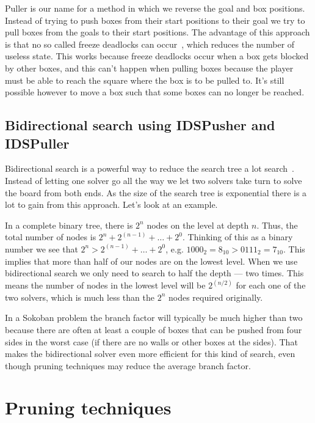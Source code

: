 \documentclass[a4paper,11pt]{article}
\renewcommand{\*}[0]{\cdot}
\begin{document}
Puller is our name for a method in which we reverse the goal and box positions.
Instead of trying to push boxes from their start positions to their goal we try
to pull boxes from the goals to their start positions. The advantage of this
approach is that no so called freeze deadlocks can occur~\cite{takes2007},
which reduces the number of useless state. This works because freeze deadlocks
occur when a box gets blocked by other boxes, and this can't happen when
pulling boxes because the player must be able to reach the square where the box
is to be pulled to.  It's still possible however to move a box such that some
boxes can no longer be reached.


\subsection{Bidirectional search using IDSPusher and IDSPuller}

Bidirectional search is a powerful way to reduce the search tree a lot
search~\cite{russell2009}. Instead of letting one solver go all the way we let
two solvers take turn to solve the board from both ends. As the size of the
search tree is exponential there is a lot to gain from this approach. Let's
look at an example.

In a complete binary tree, there is $2^n$ nodes on the level at depth $n$. Thus,
the total number of nodes is $2^n + 2^{(n-1)} + \ldots + 2^0$. Thinking of this
as a binary number we see that $2^n > 2^{(n-1)} + \ldots + 2^0$, e.g. $1000_2 =
8_{10} > 0111_2 = 7_{10}$. This implies that more than half of our nodes are on
the lowest level. When we use bidirectional search we only need to search to
half the depth --- two times. This means the number of nodes in the lowest level
will be $2^{(n/2)}$ for each one of the two solvers, which is much less than the
$2^n$ nodes required originally.

In a Sokoban problem the branch factor will typically be much higher than two
because there are often at least a couple of boxes that can be pushed from four
sides in the worst case (if there are no walls or other boxes at the sides).
That makes the bidirectional solver even more efficient for this kind of
search, even though pruning techniques may reduce the average branch factor.



\section{Pruning techniques}
\end{document}
